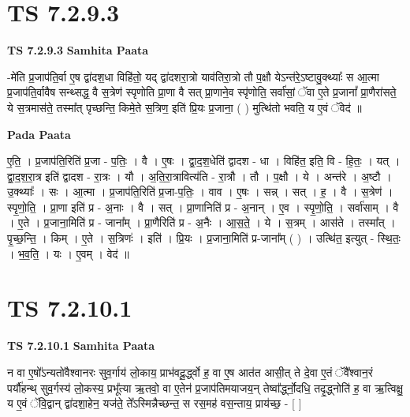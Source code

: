 \documentclass[17pt]{extarticle}
\begin{document}
\section*{ TS 7.2.9.3 }

\textbf{TS 7.2.9.3 } \newline
\textbf{Samhita Paata} \newline

-मे॑ति प्र॒जाप॑ति॒र्वा ए॒ष द्वा॑दश॒धा विहि॑तो॒ यद् द्वा॑दशरा॒त्रो याव॑तिरा॒त्रो तौ प॒क्षौ येऽन्त॑रे॒ऽष्टावु॒क्थ्याः᳚ स आ॒त्मा प्र॒जाप॑ति॒र्वावैष सन्थ्सद्ध॒ वै स॒त्रेण॑ स्पृणोति प्रा॒णा वै सत् प्रा॒णाने॒व स्पृ॑णोति॒ सर्वा॑सां॒ ॅवा ए॒ते प्र॒जानां᳚ प्रा॒णैरा॑सते॒ ये स॒त्रमास॑ते॒ तस्मा᳚त् पृच्छन्ति॒ किमे॒ते स॒त्रिण॒ इति॑ प्रि॒यः प्र॒जाना॒ ( ) मुत्थि॑तो भवति॒ य ए॒वं ॅवेद॑ ॥ \newline

\textbf{Pada Paata} \newline

ए॒ति॒ । प्र॒जाप॑ति॒रिति॑ प्र॒जा - प॒तिः॒ । वै । ए॒षः । द्वा॒द॒श॒धेति॑ द्वादश - धा । विहि॑त॒ इति॒ वि - हि॒तः॒ । यत् । द्वा॒द॒श॒रा॒त्र इति॑ द्वादश - रा॒त्रः । यौ । अ॒ति॒रा॒त्रावित्य॑ति - रा॒त्रौ । तौ । प॒क्षौ । ये । अन्त॑रे । अ॒ष्टौ । उ॒क्थ्याः᳚ । सः । आ॒त्मा । प्र॒जाप॑ति॒रिति॑ प्र॒जा-प॒तिः॒ । वाव । ए॒षः । सन्न् । सत् । ह॒ । वै । स॒त्रेण॑ । स्पृ॒णो॒ति॒ । प्रा॒णा इति॑ प्र - अ॒नाः । वै । सत् । प्रा॒णानिति॑ प्र - अ॒नान् । ए॒व । स्पृ॒णो॒ति॒ । सर्वा॑साम् । वै । ए॒ते । प्र॒जाना॒मिति॑ प्र - जाना᳚म् । प्रा॒णैरिति॑ प्र - अ॒नैः । आ॒स॒ते॒ । ये । स॒त्रम् । आस॑ते । तस्मा᳚त् । पृ॒च्छ॒न्ति॒ । किम् । ए॒ते । स॒त्रिणः॑ । इति॑ । प्रि॒यः । प्र॒जाना॒मिति॑ प्र-जाना᳚म् ( ) । उत्थि॑त॒ इत्युत् - स्थि॒तः॒ । भ॒व॒ति॒ । यः । ए॒वम् । वेद॑ ॥  \newline




\section*{ TS 7.2.10.1 }

\textbf{TS 7.2.10.1 } \newline
\textbf{Samhita Paata} \newline

न वा ए॒षो᳚ऽन्यतो॑वैश्वानरः सुव॒र्गाय॑ लो॒काय॒ प्राभ॑वदू॒र्द्ध्वो ह॒ वा ए॒ष आत॑त आसी॒त् ते दे॒वा ए॒तं ॅवै᳚श्वान॒रं पर्यौ॑हन्थ् सुव॒र्गस्य॑ लो॒कस्य॒ प्रभू᳚त्या ऋ॒तवो॒ वा ए॒तेन॑ प्र॒जाप॑तिमयाजय॒न् तेष्वा᳚र्द्ध्नो॒दधि॒ तदृ॒द्ध्नोति॑ ह॒ वा ऋ॒त्विक्षु॒ य ए॒वं ॅवि॒द्वान् द्वा॑दशा॒हेन॒ यज॑ते॒ ते᳚ऽस्मिन्नैच्छन्त॒ स रस॒मह॑ वस॒न्ताय॒ प्राय॑च्छ॒ - [  ] \newline
\end{document}
